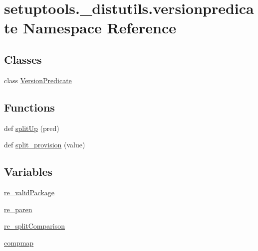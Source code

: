 \hypertarget{namespacesetuptools_1_1__distutils_1_1versionpredicate}{}\section{setuptools.\+\_\+distutils.\+versionpredicate Namespace Reference}
\label{namespacesetuptools_1_1__distutils_1_1versionpredicate}
\subsection*{Classes}
\begin{DoxyCompactItemize}
\item 
class \hyperlink{classsetuptools_1_1__distutils_1_1versionpredicate_1_1VersionPredicate}{Version\+Predicate}
\end{DoxyCompactItemize}
\subsection*{Functions}
\begin{DoxyCompactItemize}
\item 
def \hyperlink{namespacesetuptools_1_1__distutils_1_1versionpredicate_aef106f185adf3667cf513ee0af81c8fa}{split\+Up} (pred)
\item 
def \hyperlink{namespacesetuptools_1_1__distutils_1_1versionpredicate_af4072cfd07f97b5b71a42d2c9de5a8cf}{split\+\_\+provision} (value)
\end{DoxyCompactItemize}
\subsection*{Variables}
\begin{DoxyCompactItemize}
\item 
\hyperlink{namespacesetuptools_1_1__distutils_1_1versionpredicate_a1c1ab5d3991e2da262c199dbcaa5e833}{re\+\_\+valid\+Package}
\item 
\hyperlink{namespacesetuptools_1_1__distutils_1_1versionpredicate_aa9b63cc0b89ab9b811479748e30242b3}{re\+\_\+paren}
\item 
\hyperlink{namespacesetuptools_1_1__distutils_1_1versionpredicate_aacaf5c82de4677b1a960449710773798}{re\+\_\+split\+Comparison}
\item 
\hyperlink{namespacesetuptools_1_1__distutils_1_1versionpredicate_a3f93758671afdc6b6be3afff323407f7}{compmap}
\end{DoxyCompactItemize}


